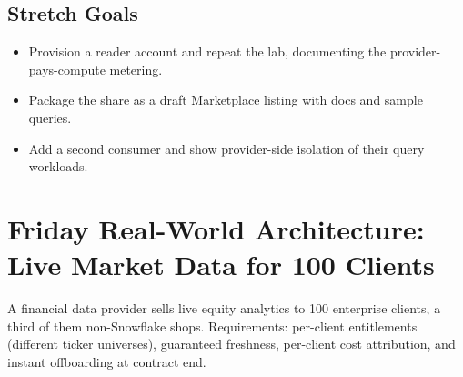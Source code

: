\subsection*{Stretch Goals}
\begin{itemize}
    \item Provision a reader account and repeat the lab, documenting the provider-pays-compute metering.
    \item Package the share as a draft Marketplace listing with docs and sample queries.
    \item Add a second consumer and show provider-side isolation of their query workloads.
\end{itemize}

\section{Friday Real-World Architecture: Live Market Data for 100 Clients}
A financial data provider sells live equity analytics to 100 enterprise clients, a third of them non-Snowflake shops. Requirements: per-client entitlements (different ticker universes), guaranteed freshness, per-client cost attribution, and instant offboarding at contract end.

